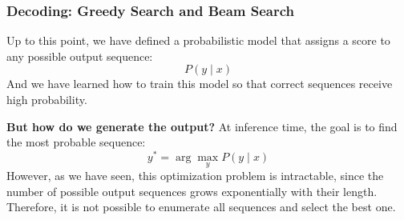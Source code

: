 \subsubsection{Decoding: Greedy Search and Beam Search}

Up to this point, we have defined a probabilistic model that assigns a score to any possible output sequence:
\begin{equation*}
    P(y \mid x)
\end{equation*}
And we have learned how to train this model so that correct sequences receive high probability.

\highspace
\textcolor{Green3}{ \textbf{But how do we generate the output?}} At inference time, the goal is to find the most probable sequence:
\begin{equation*}
    y^* = \arg\max_y P(y \mid x)
\end{equation*}
However, as we have seen, this optimization problem is intractable, since the number of possible output sequences grows exponentially with their length. Therefore, it is not possible to enumerate all sequences and select the best one.

